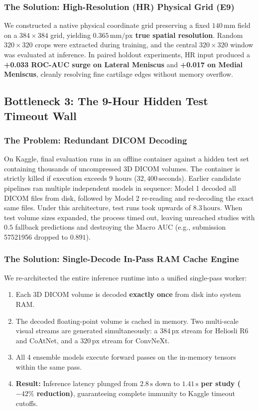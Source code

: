 \documentclass[11pt,a4paper]{article}
\begin{document}
\subsubsection{The Solution: High-Resolution (HR) Physical Grid (E9)}
We constructed a native physical coordinate grid preserving a fixed $140\,\text{mm}$ field on a $384 \times 384$ grid, yielding \textbf{$0.365\,\text{mm/px}$ true spatial resolution}. Random $320 \times 320$ crops were extracted during training, and the central $320 \times 320$ window was evaluated at inference. In paired holdout experiments, HR input produced a \textbf{+0.033 ROC-AUC surge on Lateral Meniscus} and \textbf{+0.017 on Medial Meniscus}, cleanly resolving fine cartilage edges without memory overflow.

\subsection{Bottleneck 3: The 9-Hour Hidden Test Timeout Wall}
\subsubsection{The Problem: Redundant DICOM Decoding}
On Kaggle, final evaluation runs in an offline container against a hidden test set containing thousands of uncompressed 3D DICOM volumes. The container is strictly killed if execution exceeds 9 hours ($32,400\,\text{seconds}$).
Earlier candidate pipelines ran multiple independent models in sequence: Model 1 decoded all DICOM files from disk, followed by Model 2 re-reading and re-decoding the exact same files. Under this architecture, test runs took upwards of $8.3\,\text{hours}$. When test volume sizes expanded, the process timed out, leaving unreached studies with $0.5$ fallback predictions and destroying the Macro AUC (e.g., submission 57521956 dropped to $0.891$).

\subsubsection{The Solution: Single-Decode In-Pass RAM Cache Engine}
We re-architected the entire inference runtime into a unified single-pass worker:
\begin{enumerate}
    \item Each 3D DICOM volume is decoded \textbf{exactly once} from disk into system RAM.
    \item The decoded floating-point volume is cached in memory. Two multi-scale visual streams are generated simultaneously: a $384\,\text{px}$ stream for Heliosli R6 and CoAtNet, and a $320\,\text{px}$ stream for ConvNeXt.
    \item All 4 ensemble models execute forward passes on the in-memory tensors within the same pass.
    \item \textbf{Result:} Inference latency plunged from $2.8\,\text{s}$ down to \textbf{$1.41\,\text{s}$ per study ($-42\%$ reduction)}, guaranteeing complete immunity to Kaggle timeout cutoffs.
\end{enumerate}
\end{document}
